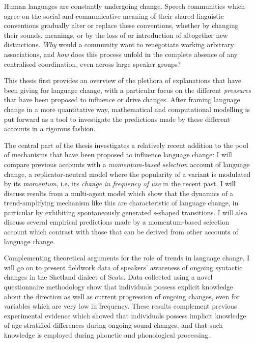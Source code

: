 Human languages are constantly undergoing change. Speech communities which agree on the social and communicative meaning of their shared linguistic conventions gradually alter or replace these conventions, whether by changing their sounds, meanings, or by the loss of or introduction of altogether new distinctions. \emph{Why} would a community want to renegotiate working arbitrary associations, and \emph{how} does this process unfold in the complete absence of any centralised coordination, even across large speaker groups?

This thesis first provides an overview of the plethora of explanations that have been giving for language change, with a particular focus on the different \emph{pressures} that have been proposed to influence or drive changes. After framing language change in a more quantitative way, mathematical and computational modelling is put forward as a tool to investigate the predictions made by these different accounts in a rigorous fashion.

The central part of the thesis investigates a relatively recent addition to the pool of mechanisms that have been proposed to influence language change: I will compare previous accounts with a \emph{momentum-based selection} account of language change, a replicator-neutral model where the popularity of a variant is modulated by its \emph{momentum}, i.e. its \emph{change in frequency of use} in the recent past. I will discuss results from a multi-agent model which show that the dynamics of a trend-amplifying mechanism like this are characteristic of language change, in particular by exhibiting spontaneously generated s-shaped transitions. I will also discuss several empirical predictions made by a momentum-based selection account which contrast with those that can be derived from other accounts of language change.

Complementing theoretical arguments for the role of trends in language change, I will go on to present fieldwork data of speakers' awareness of ongoing syntactic changes in the Shetland dialect of Scots. Data collected using a novel questionnaire methodology show that individuals possess explicit knowledge about the direction as well as current progression of ongoing changes, even for variables which are very low in frequency. These results complement previous experimental evidence which showed that individuals possess implicit knowledge of age-stratified differences during ongoing sound changes, and that such knowledge is employed during phonetic and phonological processing.

